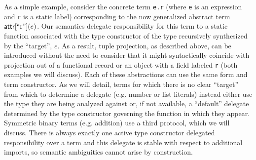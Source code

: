 \documentclass[9pt,preprint]{sigplanconf}
\newcommand{\FF}[1]{{\sf #1}}
\newcommand{\lstinlinep}[1]{\lstinline[language=Python,basicstyle=\ttfamily\small]{#1}}
\begin{document}
As a simple example, consider the concrete term \lstinlinep{e.r} (where \lstinlinep{e} is an expression and \lstinlinep{r} is a static label) corresponding to the now generalized abstract term  $\FF{attr}[\text{``r''}](e)$. Our semantics delegate responsibility for this term to a static function associated with the type constructor of the type recursively synthesized by the ``target'', $e$. As a result, tuple projection, as described above, can be introduced without the need to consider that it might syntactically coincide with projection out of a functional record or an object with a field labeled \lstinlinep{r} (both examples we will discuss). Each of these abstractions can use the same form and term constructor. As we will detail, terms for which there is no clear ``target'' from which to determine a delegate (e.g. number or list literals) instead either use the type they are being analyzed against or, if not available, a ``default'' delegate determined by the type constructor governing the function in which they appear. Symmetric binary terms (e.g. addition) use a third protocol, which we will discuss. There is always exactly one active type constructor delegated  responsibility over a term and this delegate is stable with respect to additional imports, so semantic ambiguities cannot arise by construction. %

\end{document}
